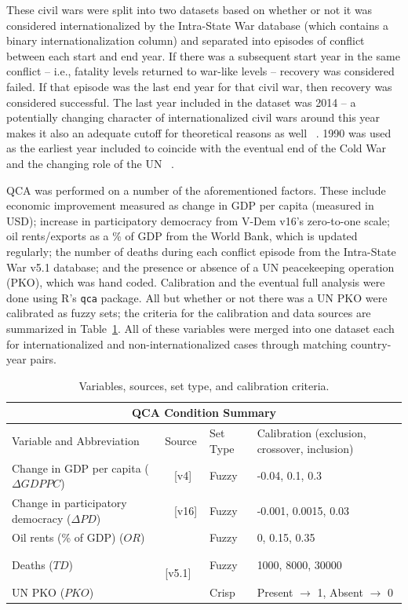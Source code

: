 \documentclass{article}
\begin{document}
These civil wars were split into two datasets based on whether or not it was considered internationalized by the Intra-State War database (which contains a binary internationalization column) and separated into episodes of conflict between each start and end year. If there was a subsequent start year in the same conflict -- i.e., fatality levels returned to war-like levels -- recovery was considered failed. If that episode was the last end year for that civil war, then recovery was considered successful. The last year included in the dataset was 2014 -- a potentially changing character of internationalized civil wars around this year makes it also an adequate cutoff for theoretical reasons as well ~\cite{bellamy}. 1990 was used as the earliest year included to coincide with the eventual end of the Cold War and the changing role of the UN ~\cite{hozic}. 

QCA was performed on a number of the aforementioned factors. These include economic improvement measured as change in GDP per capita (measured in USD); increase in participatory democracy from V-Dem v16's zero-to-one scale; oil rents/exports as a \% of GDP from the World Bank, which is updated regularly; the number of deaths during each conflict episode from the Intra-State War v5.1 database; and the presence or absence of a UN peacekeeping operation (PKO), which was hand coded. Calibration and the eventual full analysis were done using R's \texttt{qca} package. All but whether or not there was a UN PKO were calibrated as fuzzy sets; the criteria for the calibration and data sources are summarized in Table~\ref{tab:qca_conditions}. All of these variables were merged into one dataset each for internationalized and non-internationalized cases through matching country-year pairs.

\begin{table}[ht]
    \centering
    \small
    \begin{tabular}{p{4cm} p{2.5cm} p{1.5cm} p{3.5cm}}
        \hline
        \multicolumn{4}{c}{QCA Condition Summary} \\
        \hline
        Variable and Abbreviation & Source & Set Type & Calibration (exclusion, crossover, inclusion) \\
        \hline
        Change in GDP per capita ($\Delta GDPPC$) & ~\cite{fariss} [v4] & Fuzzy & -0.04, 0.1, 0.3 \\
        Change in participatory democracy ($\Delta PD$) & ~\cite{vdem} [v16] & Fuzzy & -0.001, 0.0015, 0.03 \\
        Oil rents (\% of GDP) ($OR$) & ~\cite{vdem} & Fuzzy & 0, 0.15, 0.35 \\
        Deaths ($TD$) & ~\cite{cow} [v5.1] & Fuzzy & 1000, 8000, 30000 \\
        UN PKO ($PKO$) & ~\cite{un-pko-list} & Crisp & Present $\to$ 1,  Absent $\to$ 0 \\
        \hline
    \end{tabular}
    \caption{Variables, sources, set type, and calibration criteria.}
    \label{tab:qca_conditions}
\end{table}
\end{document}
